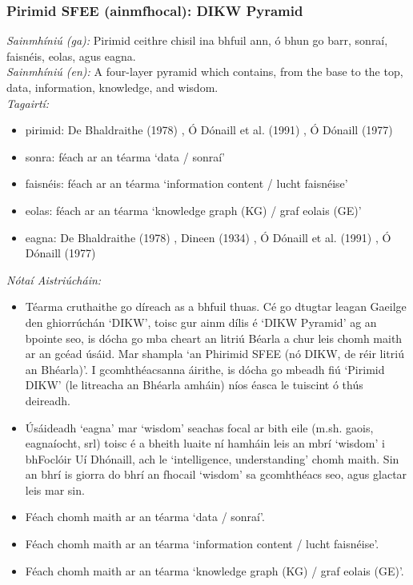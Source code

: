 \subsubsection*{Pirimid SFEE (ainmfhocal): DIKW Pyramid}
 \noindent \textit{Sainmhíniú (ga):} Pirimid ceithre chisil ina bhfuil ann, ó bhun go barr, sonraí, faisnéis, eolas, agus eagna.
\\
 \noindent \textit{Sainmhíniú (en):} A four-layer pyramid which contains, from the base to the top, data, information, knowledge, and wisdom.
\\
 \noindent \textit{Tagairtí:}
\begin{itemize}
	\item pirimid: De Bhaldraithe (1978) \cite{de-bhaldraithe}, Ó Dónaill et al. (1991) \cite{focloir-beag}, Ó Dónaill (1977) \cite{odonaill}
	\item sonra: féach ar an téarma `data / sonraí'
	\item faisnéis: féach ar an téarma `information content / lucht faisnéise'
	\item eolas: féach ar an téarma `knowledge graph (KG) / graf eolais (GE)'
	\item eagna: De Bhaldraithe (1978) \cite{de-bhaldraithe}, Dineen (1934) \cite{dineen}, Ó Dónaill et al. (1991) \cite{focloir-beag}, Ó Dónaill (1977) \cite{odonaill}
\end{itemize}

 \noindent \textit{Nótaí Aistriúcháin:}
\begin{itemize}
	\item Téarma cruthaithe go díreach as a bhfuil thuas. Cé go dtugtar leagan Gaeilge den ghiorrúchán `DIKW', toisc gur ainm dílis é `DIKW Pyramid' ag an bpointe seo, is dócha go mba cheart an litriú Béarla a chur leis chomh maith ar an gcéad úsáid. Mar shampla `an Phirimid SFEE (nó DIKW, de réir litriú an Bhéarla)'. I gcomhthéacsanna áirithe, is dócha go mbeadh fiú `Pirimid DIKW' (le litreacha an Bhéarla amháin) níos éasca le tuiscint ó thús deireadh.
	\item Úsáideadh `eagna' mar `wisdom' seachas focal ar bith eile (m.sh. gaois, eagnaíocht, srl) toisc é a bheith luaite ní hamháin leis an mbrí `wisdom' i bhFoclóir Uí Dhónaill, ach le `intelligence, understanding' chomh maith. Sin an bhrí is giorra do bhrí an fhocail `wisdom' sa gcomhthéacs seo, agus glactar leis mar sin.
	\item Féach chomh maith ar an téarma `data / sonraí'.
	\item Féach chomh maith ar an téarma `information content / lucht faisnéise'.
	\item Féach chomh maith ar an téarma `knowledge graph (KG) / graf eolais (GE)'.
\end{itemize}


